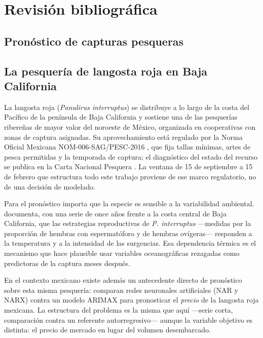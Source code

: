 \chapter{Revisión bibliográfica}
\label{cap:revision}

\section{Pronóstico de capturas pesqueras}



\section{La pesquería de langosta roja en Baja California}
\label{sec:revision_pesqueria}

La langosta roja (\emph{Panulirus interruptus}) se distribuye a lo largo de la costa del
Pacífico de la península de Baja California y sostiene una de las pesquerías ribereñas de mayor
valor del noroeste de México, organizada en cooperativas con zonas de captura asignadas. Su
aprovechamiento está regulado por la Norma Oficial Mexicana NOM-006-SAG/PESC-2016 \citep{nom006pesc2016}, que fija
tallas mínimas, artes de pesca permitidas y la temporada de captura; el diagnóstico del estado
del recurso se publica en la Carta Nacional Pesquera \citep{cnp2025}. La ventana de 15 de
septiembre a 15 de febrero que estructura todo este trabajo proviene de ese marco regulatorio,
no de una decisión de modelado.

Para el pronóstico importa que la especie es sensible a la variabilidad ambiental.
\citet{vega2003} documenta, con una serie de once años frente a la costa central de Baja
California, que las estrategias reproductivas de \emph{P. interruptus} ---medidas por la
proporción de hembras con espermatóforo y de hembras ovígeras--- responden a la temperatura y a
la intensidad de las surgencias. Esa dependencia térmica es el mecanismo que hace plausible
usar variables oceanográficas rezagadas como predictoras de la captura meses después.

En el contexto mexicano existe además un antecedente directo de pronóstico sobre esta misma
pesquería: \citet{hernandez2022} comparan redes neuronales artificiales (NAR y NARX) contra un
modelo ARIMAX para pronosticar el \emph{precio} de la langosta roja mexicana. La estructura del
problema es la misma que aquí ---serie corta, comparación contra un referente autorregresivo---
aunque la variable objetivo es distinta: el precio de mercado en lugar del volumen desembarcado.

